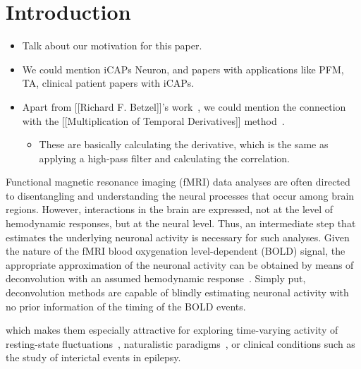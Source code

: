 \section{Introduction}

\begin{itemize}

    \item Talk about our motivation for this paper.

    \item We could mention iCAPs Neuron, and papers with applications like PFM, TA, clinical patient papers with iCAPs.

    \item Apart from [[Richard F. Betzel]]'s work~\cite{betzel2020temporal,esfahlani2020high,faskowitz2020edge}, we could mention the connection with the
    [[Multiplication of Temporal Derivatives]] method~\cite{shine2015estimation,shine2016dynamics}.

    \begin{itemize}
        \item These are basically calculating the derivative, which is the same as applying a high-pass filter and calculating the correlation.
    \end{itemize}

\end{itemize}


Functional magnetic resonance imaging (fMRI) data analyses are often directed to disentangling and understanding the neural processes that occur among brain regions. However, interactions in the brain are expressed, not at the level of hemodynamic responses, but at the neural level. Thus, an intermediate step that estimates the underlying neuronal activity is necessary for such analyses. Given the nature of the fMRI blood oxygenation level-dependent (BOLD) signal, the appropriate approximation of the neuronal activity can be obtained by means of deconvolution with an assumed hemodynamic response~\cite{gitelman2003ModelingRegionalPsychophysiologic}. Simply put, deconvolution methods are capable of blindly estimating neuronal activity with no prior information of the timing of the BOLD events.

which makes them especially attractive for exploring time-varying activity of resting-state fluctuations~\cite{petridou2013periods,karahanouglu2015transient,karahanouglu2017dynamics,kinany2020dynamic,gonzalez2019imaging}, naturalistic paradigms~\cite{betzel2020temporal}, or clinical conditions such as the study of interictal events in epilepsy.

